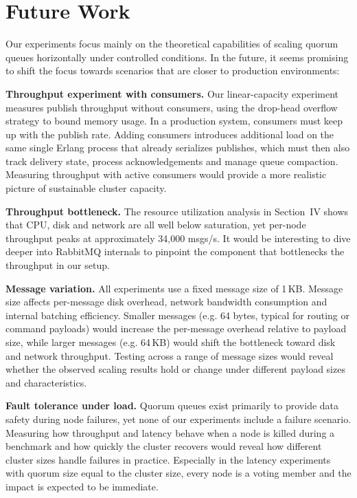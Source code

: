 \section{Future Work}

Our experiments focus mainly on the theoretical capabilities of scaling quorum queues horizontally under controlled conditions. In the future, it seems promising to shift the focus towards scenarios that are closer to production environments:

\textbf{Throughput experiment with consumers.} Our linear-capacity experiment measures publish throughput without consumers, using the drop-head overflow strategy to bound memory usage. In a production system, consumers must keep up with the publish rate. Adding consumers introduces additional load on the same single Erlang process that already serializes publishes, which must then also track delivery state, process acknowledgements and manage queue compaction. Measuring throughput with active consumers would provide a more realistic picture of sustainable cluster capacity.

\textbf{Throughput bottleneck.} The resource utilization analysis in Section~IV shows that CPU, disk and network are all well below saturation, yet per-node throughput peaks at approximately 34{,}000 msgs/s. It would be interesting to dive deeper into RabbitMQ internals to pinpoint the component that bottlenecks the throughput in our setup.

\textbf{Message variation.} All experiments use a fixed message size of 1\,KB. Message size affects per-message disk overhead, network bandwidth consumption and internal batching efficiency. Smaller messages (e.g. 64 bytes, typical for routing or command payloads) would increase the per-message overhead relative to payload size, while larger messages (e.g. 64\,KB) would shift the bottleneck toward disk and network throughput. Testing across a range of message sizes would reveal whether the observed scaling results hold or change under different payload sizes and characteristics.

\textbf{Fault tolerance under load.} Quorum queues exist primarily to provide data safety during node failures, yet none of our experiments include a failure scenario. Measuring how throughput and latency behave when a node is killed during a benchmark and how quickly the cluster recovers would reveal how different cluster sizes handle failures in practice. Especially in the latency experiments with quorum size equal to the cluster size, every node is a voting member and the impact is expected to be immediate.
